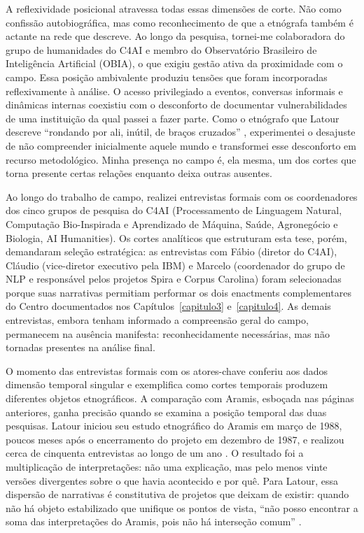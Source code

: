 A reflexividade posicional atravessa todas essas dimensões de corte. Não como confissão autobiográfica, mas como reconhecimento de que a etnógrafa também é actante na rede que descreve. Ao longo da pesquisa, tornei-me colaboradora do grupo de humanidades do C4AI e membro do Observatório Brasileiro de Inteligência Artificial (OBIA), o que exigiu gestão ativa da proximidade com o campo. Essa posição ambivalente produziu tensões que foram incorporadas reflexivamente à análise. O acesso privilegiado a eventos, conversas informais e dinâmicas internas coexistiu com o desconforto de documentar vulnerabilidades de uma instituição da qual passei a fazer parte. Como o etnógrafo que Latour descreve ``rondando por ali, inútil, de braços cruzados'' \parencite[p. 62]{Latour2017Esperanca}, experimentei o desajuste de não compreender inicialmente aquele mundo e transformei esse desconforto em recurso metodológico. Minha presença no campo é, ela mesma, um dos cortes que torna presente certas relações enquanto deixa outras ausentes.

Ao longo do trabalho de campo, realizei entrevistas formais com os coordenadores dos cinco grupos de pesquisa do C4AI (Processamento de Linguagem Natural, Computação Bio-Inspirada e Aprendizado de Máquina, Saúde, Agronegócio e Biologia, AI Humanities). Os cortes analíticos que estruturam esta tese, porém, demandaram seleção estratégica: as entrevistas com Fábio (diretor do C4AI), Cláudio (vice-diretor executivo pela IBM) e Marcelo (coordenador do grupo de NLP e responsável pelos projetos Spira e Corpus Carolina) foram selecionadas porque suas narrativas permitiam performar os dois enactments complementares do Centro documentados nos Capítulos~\ref{capitulo3} e~\ref{capitulo4}. As demais entrevistas, embora tenham informado a compreensão geral do campo, permanecem na ausência manifesta: reconhecidamente necessárias, mas não tornadas presentes na análise final.

O momento das entrevistas formais com os atores-chave conferiu aos dados dimensão temporal singular e exemplifica como cortes temporais produzem diferentes objetos etnográficos. A comparação com Aramis, esboçada nas páginas anteriores, ganha precisão quando se examina a posição temporal das duas pesquisas. Latour iniciou seu estudo etnográfico do Aramis em março de 1988, poucos meses após o encerramento do projeto em dezembro de 1987, e realizou cerca de cinquenta entrevistas ao longo de um ano \parencite{Latour1993Aramis}. O resultado foi a multiplicação de interpretações: não uma explicação, mas pelo menos vinte versões divergentes sobre o que havia acontecido e por quê. Para Latour, essa dispersão de narrativas é constitutiva de projetos que deixam de existir: quando não há objeto estabilizado que unifique os pontos de vista, ``não posso encontrar a soma das interpretações do Aramis, pois não há interseção comum'' \parencite[p. 15]{Latour1993Aramis}.

